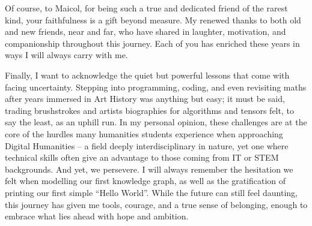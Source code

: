 \begin{spacing}{1.5}
Of course, to Maicol, for being such a true and dedicated friend of the rarest kind, your faithfulness is a gift beyond measure. My renewed thanks to both old and new friends, near and far, who have shared in laughter, motivation, and companionship throughout this journey. Each of you has enriched these years in ways I will always carry with me.

Finally, I want to acknowledge the quiet but powerful lessons that come with facing uncertainty. Stepping into programming, coding, and even revisiting maths after years immersed in Art History was anything but easy; it must be said, trading brushstrokes and artists biographies for algorithms and tensors felt, to say the least, as an uphill run. In my personal opinion, these challenges are at the core of the hurdles many humanities students experience when approaching Digital Humanities -- a field deeply interdisciplinary in nature, yet one where technical skills often give an advantage to those coming from IT or STEM backgrounds. And yet, we persevere. I will always remember the hesitation we felt when modelling our first knowledge graph, as well as the gratification of printing our first simple ``Hello World''. While the future can still feel daunting, this journey has given me tools, courage, and a true sense of belonging, enough to embrace what lies ahead with hope and ambition.

\end{spacing}